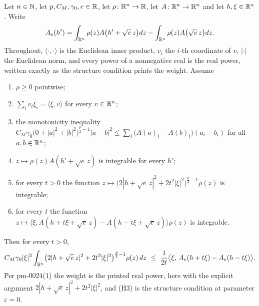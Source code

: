\begin{helper}
Let $n\in\mathbb{N}$, let $p,C_M,\gamma_0,e\in\mathbb{R}$, let $\rho\colon\mathbb{R}^n\to\mathbb{R}$, let
$A\colon\mathbb{R}^n\to\mathbb{R}^n$ and let $h,\xi\in\mathbb{R}^n$.  Write
\[
A_e(h')=\int_{\mathbb{R}^n}\rho(z)A\bigl(h'+\sqrt e\,z\bigr)dz
  -\int_{\mathbb{R}^n}\rho(z)A\bigl(\sqrt e\,z\bigr)dz .
\]
Throughout, $\langle\cdot,\cdot\rangle$ is the Euclidean inner product,
$v_i$ the $i$-th coordinate of $v$, $|\cdot|$ the Euclidean norm, and every
power of a nonnegative real is the real power, written exactly as the structure
condition prints the weight.  Assume
\begin{enumerate}
\item[(H1)] $\rho\ge0$ pointwise;
\item[(H2)] $\sum_iv_i\xi_i=\langle\xi,v\rangle$ for every $v\in\mathbb{R}^n$;
\item[(H3)] the monotonicity inequality
  $C_M\gamma_0\bigl(0+|a|^2+|b|^2\bigr)^{\frac p2-1}|a-b|^2
    \le\sum_i\bigl(A(a)_i-A(b)_i\bigr)(a_i-b_i)$
  for all $a,b\in\mathbb{R}^n$;
\item[(H4)] $z\mapsto\rho(z)A(h'+\sqrt e\,z)$ is integrable for every $h'$;
\item[(H5)] for every $t>0$ the function
  $z\mapsto\bigl(2|h+\sqrt e\,z|^2+2t^2|\xi|^2\bigr)^{\frac p2-1}\rho(z)$ is
  integrable;
\item[(H6)] for every $t$ the function
  $z\mapsto\bigl\langle\xi,A(h+t\xi+\sqrt e\,z)-A(h-t\xi+\sqrt e\,z)\bigr\rangle\rho(z)$
  is integrable.
\end{enumerate}
Then for every $t>0$,
\[
C_M\gamma_0|\xi|^2\int_{\mathbb{R}^n}\bigl(2|h+\sqrt e\,z|^2+2t^2|\xi|^2\bigr)^{\frac p2-1}\rho(z)\,dz
\ \le\ \frac1{2t}\bigl\langle\xi,\,A_e(h+t\xi)-A_e(h-t\xi)\bigr\rangle .
\]
Per pm-0024(1) the weight is the printed real power, here with the explicit
argument $2|h+\sqrt e\,z|^2+2t^2|\xi|^2$, and (H3) is the structure condition at
parameter $\varepsilon=0$.
\end{helper}
